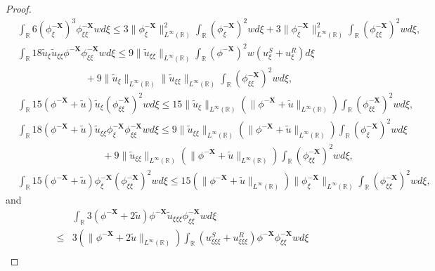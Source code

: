 \documentclass[10pt,reqno]{amsart}
\numberwithin{equation}{section}
\begin{document}
\begin{proof}
\begin{align*}
			&\int_{\mathbb{R}}6(\phi_{\xi}^{-\mathbf{X}})^{3}\phi_{\xi\xi}^{-\mathbf{X}}wd\xi\leq 3\|\phi^{-\mathbf{X}}_{\xi}\|_{L^{\infty}(\mathbb{R})}^2\int_{\mathbb{R}}(\phi_{\xi}^{-\mathbf{X}})^2wd\xi+3\|\phi^{-\mathbf{X}}_{\xi}\|_{L^{\infty}(\mathbb{R})}^2\int_{\mathbb{R}}(\phi_{\xi\xi}^{-\mathbf{X}})^2wd\xi,\\
			&\int_{\mathbb{R}}18\tilde{u}_{\xi}\tilde{u}_{\xi\xi}\phi^{-\mathbf{X}}\phi_{\xi\xi}^{-\mathbf{X}}wd\xi\leq9\|\tilde{u}_{\xi\xi}\|_{L^{\infty}(\mathbb{R})}\int_{\mathbb{R}}(\phi^{-\mathbf{X}})^2w\left(u^S_{\xi}+u^R_{\xi}\right)d\xi\\
			&\ \ \ \ \ \ \ \ \ \ \ \ \ \ \ \ \ \ \ \ \ \ \ \ \ \ \ \ \ \ \ +9\|\tilde{u}_{\xi}\|_{L^{\infty}(\mathbb{R})}\|\tilde{u}_{\xi\xi}\|_{L^{\infty}(\mathbb{R})}\int_{\mathbb{R}}(\phi_{\xi\xi}^{-\mathbf{X}})^2wd\xi,\\
			&\int_{\mathbb{R}}15(\phi^{-\mathbf{X}}+\tilde{u})\tilde{u}_{\xi}(\phi_{\xi\xi}^{-\mathbf{X}})^{2}wd\xi\leq15\|\tilde{u}_{\xi}\|_{L^{\infty}(\mathbb{R})}\left(\|\phi^{-\mathbf{X}}+\tilde{u}\|_{L^{\infty}(\mathbb{R})}\right)\int_{\mathbb{R}}(\phi_{\xi\xi}^{-\mathbf{X}})^{2}wd\xi,\\
			&\int_{\mathbb{R}}18(\phi^{-\mathbf{X}}+\tilde{u})\tilde{u}_{\xi\xi}\phi_{\xi}^{-\mathbf{X}}\phi_{\xi\xi}^{-\mathbf{X}}wd\xi\leq 9\|\tilde{u}_{\xi\xi}\|_{L^{\infty}(\mathbb{R})}\left(\|\phi^{-\mathbf{X}}+\tilde{u}\|_{L^{\infty}(\mathbb{R})}\right)\int_{\mathbb{R}}(\phi_{\xi}^{-\mathbf{X}})^{2}wd\xi\\
			&\ \ \ \ \ \ \ \ \ \ \ \ \ \ \ \ \ \ \ \ \ \ \ \ \ \ \ \ \ \ \ \ \ \ \ \ \ \ \ +9\|\tilde{u}_{\xi\xi}\|_{L^{\infty}(\mathbb{R})}\left(\|\phi^{-\mathbf{X}}+\tilde{u}\|_{L^{\infty}(\mathbb{R})}\right)\int_{\mathbb{R}}(\phi_{\xi\xi}^{-\mathbf{X}})^{2}wd\xi,\\
			&\int_{\mathbb{R}}15(\phi^{-\mathbf{X}}+\tilde{u})\phi_{\xi}^{-\mathbf{X}}(\phi_{\xi\xi}^{-\mathbf{X}})^{2}wd\xi\leq15\left(\|\phi^{-\mathbf{X}}+\tilde{u}\|_{L^{\infty}(\mathbb{R})}\right)\|\phi_{\xi}^{-\mathbf{X}}\|_{L^{\infty}(\mathbb{R})}\int_{\mathbb{R}}(\phi_{\xi\xi}^{-\mathbf{X}})^{2}wd\xi,
		\end{align*}
		and
		\begin{align*}
			&\int_{\mathbb{R}}3(\phi^{-\mathbf{X}}+2\tilde{u})\phi^{-\mathbf{X}}\tilde{u}_{\xi\xi\xi}\phi_{\xi\xi}^{-\mathbf{X}}wd\xi\\
			\leq&3\left(\|\phi^{-\mathbf{X}}+2\tilde{u}\|_{L^{\infty}(\mathbb{R})}\right)\int_{\mathbb{R}}\left(u^S_{\xi\xi\xi}+u^R_{\xi\xi\xi}\right)\phi^{-\mathbf{X}}\phi_{\xi\xi}^{-\mathbf{X}}wd\xi\\

\end{align*}
\end{proof}
\end{document}
